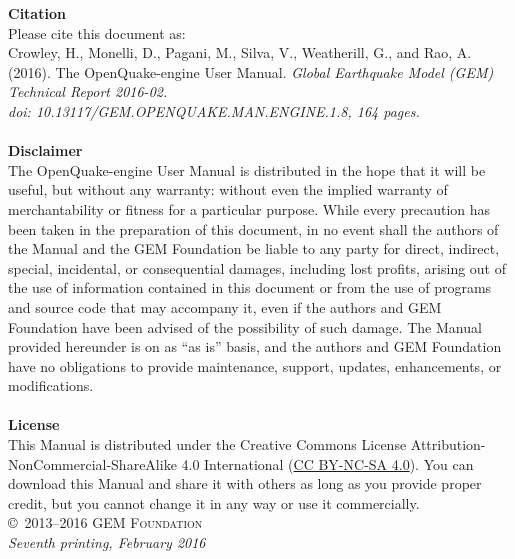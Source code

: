 \documentclass[11pt,fleqn]{book} %
\begin{document}
\noindent
   {\textbf{Citation}} \hfill \\
   Please cite this document as: \hfill \\
   Crowley, H., Monelli, D., Pagani, M., Silva, V., Weatherill, G.,
   and Rao, A. (2016). The OpenQuake-engine User Manual.
   \textit{Global Earthquake Model (GEM) Technical Report 2016-02.\\
   doi: 10.13117/GEM.OPENQUAKE.MAN.ENGINE.1.8, 164 pages.} \hfill \\
\noindent \hfill\\
\noindent
   {\bf{Disclaimer}} \hfill \\
   The OpenQuake-engine User Manual is distributed in the hope that it will be
   useful, but without any warranty: without even the implied warranty of
   merchantability or fitness for a particular purpose. While every precaution
   has been taken in the preparation of this document, in no event shall the
   authors of the Manual and the GEM Foundation be liable to any party for
   direct, indirect, special, incidental, or consequential damages, including
   lost profits, arising out of the use of information contained in this
   document or from the use of programs and source code that may accompany it,
   even if the authors and GEM Foundation have been advised of the possibility
   of such damage. The Manual provided hereunder is on as ``as is'' basis, and
   the  authors and GEM Foundation have no obligations to provide maintenance,
   support, updates, enhancements, or modifications. \hfill \\
\noindent \hfill\\
\noindent
   {\bf{License}} \hfill \\
   This Manual is distributed under the Creative Commons License  Attribution-
   NonCommercial-ShareAlike 4.0 International
   (\href{http://creativecommons.org/licenses/by-nc-sa/4.0/} {CC BY-NC-SA
   4.0}). You can download this Manual and share it with others as long as you
   provide proper credit, but you cannot change it in any way or use it
   commercially.\hfill \\

\noindent \copyright\ \textsc{2013--2016 GEM Foundation}\\
\noindent \textit{Seventh printing, February 2016} %

\end{document}
